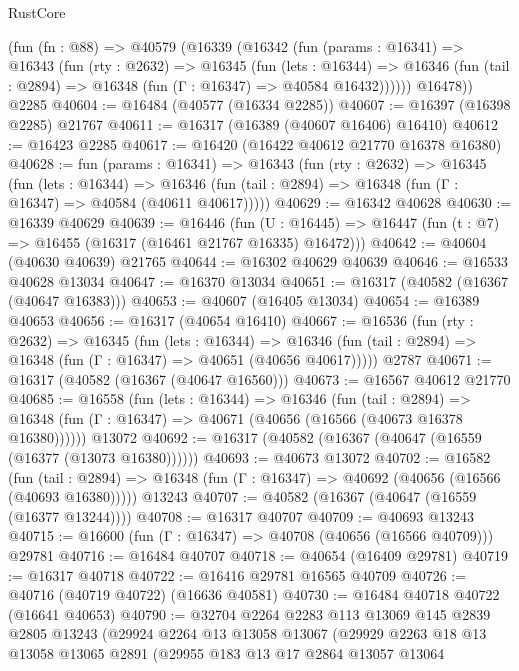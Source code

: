 \begin{lexlean}{RustCore}
\begin{coremodule}
    (fun (fn : @88) =>
    @40579
      (@16339
        (@16342
          (fun (params : @16341) =>
          @16343
            (fun (rty : @2632) =>
            @16345
              (fun (lets : @16344) =>
              @16346 (fun (tail : @2894) => @16348 (fun (Γ : @16347) => @40584 @16432))))))
        @16478))
    @2285
@40604 := @16484 (@40577 (@16334 @2285))
@40607 := @16397 (@16398 @2285) @21767
@40611 := @16317 (@16389 (@40607 @16406) @16410)
@40612 := @16423 @2285
@40617 := @16420 (@16422 @40612 @21770 @16378 @16380)
@40628 := fun (params : @16341) =>
  @16343
    (fun (rty : @2632) =>
    @16345
      (fun (lets : @16344) =>
      @16346 (fun (tail : @2894) => @16348 (fun (Γ : @16347) => @40584 (@40611 @40617)))))
@40629 := @16342 @40628
@40630 := @16339 @40629
@40639 := @16446
    (fun (U : @16445) => @16447 (fun (t : @7) => @16455 (@16317 (@16461 @21767 @16335) @16472)))
@40642 := @40604 (@40630 @40639) @21765
@40644 := @16302 @40629 @40639
@40646 := @16533 @40628 @13034
@40647 := @16370 @13034
@40651 := @16317 (@40582 (@16367 (@40647 @16383)))
@40653 := @40607 (@16405 @13034)
@40654 := @16389 @40653
@40656 := @16317 (@40654 @16410)
@40667 := @16536
    (fun (rty : @2632) =>
    @16345
      (fun (lets : @16344) =>
      @16346 (fun (tail : @2894) => @16348 (fun (Γ : @16347) => @40651 (@40656 @40617)))))
    @2787
@40671 := @16317 (@40582 (@16367 (@40647 @16560)))
@40673 := @16567 @40612 @21770
@40685 := @16558
    (fun (lets : @16344) =>
    @16346
      (fun (tail : @2894) =>
      @16348 (fun (Γ : @16347) => @40671 (@40656 (@16566 (@40673 @16378 @16380))))))
    @13072
@40692 := @16317 (@40582 (@16367 (@40647 (@16559 (@16377 (@13073 @16380))))))
@40693 := @40673 @13072
@40702 := @16582
    (fun (tail : @2894) => @16348 (fun (Γ : @16347) => @40692 (@40656 (@16566 (@40693 @16380)))))
    @13243
@40707 := @40582 (@16367 (@40647 (@16559 (@16377 @13244))))
@40708 := @16317 @40707
@40709 := @40693 @13243
@40715 := @16600 (fun (Γ : @16347) => @40708 (@40656 (@16566 @40709))) @29781
@40716 := @16484 @40707
@40718 := @40654 (@16409 @29781)
@40719 := @16317 @40718
@40722 := @16416 @29781 @16565 @40709
@40726 := @40716 (@40719 @40722) (@16636 @40581)
@40730 := @16484 @40718 @40722 (@16641 @40653)
@40790 := @32704
    @2264
    @2283
    @113
    @13069
    @145
    @2839
    @2805
    @13243
    (@29924
      @2264
      @13
      @13058
      @13067
      (@29929
        @2263
        @18
        @13
        @13058
        @13065
        @2891
        (@29955
          @183
          @13
          @17
          @2864
          @13057
          @13064

\end{coremodule}
\end{lexlean}
